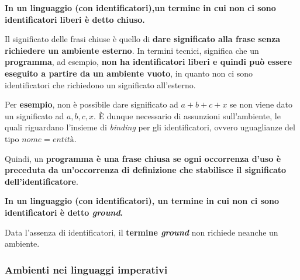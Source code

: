 \documentclass[a4paper]{article}
\begin{document}
	\begin{boxdef}
		\textbf{In un linguaggio (con identificatori),un \textcolor{Red3}{termine} in cui non ci sono identificatori liberi è detto \textcolor{Red3}{chiuso}.}
	\end{boxdef}
	
	\noindent
	Il significato delle frasi chiuse è quello di \textbf{dare significato alla frase senza richiedere un ambiente esterno}. In termini tecnici, significa che un \textbf{programma}, ad esempio, \textbf{non ha identificatori liberi e quindi può essere eseguito a partire da un ambiente vuoto}, in quanto non ci sono identificatori che richiedono un significato all'esterno.\newline

	\noindent
	Per \textcolor{Green4}{\textbf{esempio}}, non è possibile dare significato ad $a+b+c+x$ se non viene dato un significato ad $a,b,c,x$. È dunque necessario di assunzioni sull'ambiente, le quali riguardano l'insieme di \emph{binding} per gli identificatori, ovvero uguaglianze del tipo $nome = entità$.\newline
	
	\noindent
	Quindi, un \textbf{programma è una \textcolor{Red3}{frase chiusa} se ogni occorrenza d'uso è preceduta da un'occorrenza di definizione che stabilisce il significato dell'identificatore}.\newline
	
	\noindent
	\begin{boxdef}
		\textbf{In un linguaggio (con identificatori), un \textcolor{Red3}{termine} in cui non ci sono identificatori è detto \textcolor{Red3}{\emph{ground}}.}
	\end{boxdef}
	
	\noindent
	Data l'assenza di identificatori, il \textbf{termine \emph{ground}} non richiede neanche un ambiente.\newpage
	
	\subsubsection{Ambienti nei linguaggi imperativi}
	
\end{document}
